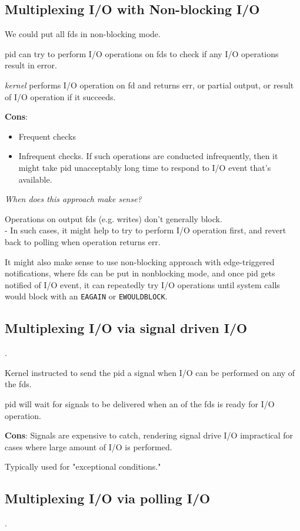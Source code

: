 \documentclass[10pt]{amsart}
\begin{document}
\begin{multicols*}{2}
\subsection{Multiplexing I/O with Non-blocking I/O}

We could put all fds in non-blocking mode.

pid can try to perform I/O operations on fds to check if any I/O operations result in error.

\emph{kernel} performs I/O operation on fd and returns err, or partial output, or result of I/O operation if it succeeds.

\textbf{Cons}:
\begin{itemize}
	\item Frequent checks
	\item Infrequent checks. If such operations are conducted infrequently, then it might take pid unacceptably long time to respond to I/O event that's available.
\end{itemize}

\emph{When does this approach make sense?}

Operations on output fds (e.g. writes) don't generally block.  \\
- In such cases, it might help to try to perform I/O operation first, and revert back to polling when operation returns err.

It might also make sense to use non-blocking approach with edge-triggered notifications, where fds can be put in nonblocking mode, and once pid gets notified of I/O event, it can repeatedly try I/O operations until system calls would block with an \texttt{EAGAIN} or \texttt{EWOULDBLOCK}. 

\subsection{Multiplexing I/O via signal driven I/O}.

Kernel instructed to send the pid a signal when I/O can be performed on any of the fds.

pid will wait for signals to be delivered when an of the fds is ready for I/O operation.

\textbf{Cons}: Signals are expensive to catch, rendering signal drive I/O impractical for cases where large amount of I/O is performed.

Typically used for "exceptional conditions."

\subsection{Multiplexing I/O via polling I/O}.


\end{multicols*}
\end{document}
